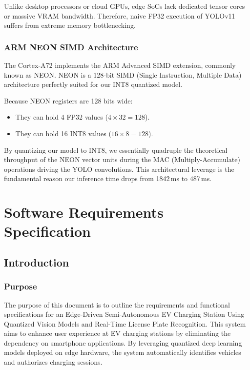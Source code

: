 \documentclass[11pt]{report}
\begin{document}
Unlike desktop processors or cloud GPUs, edge SoCs lack dedicated tensor cores or massive VRAM bandwidth. Therefore, naive FP32 execution of YOLOv11 suffers from extreme memory bottlenecking.

\subsection{ARM NEON SIMD Architecture}
The Cortex-A72 implements the ARM Advanced SIMD extension, commonly known as NEON. NEON is a 128-bit SIMD (Single Instruction, Multiple Data) architecture perfectly suited for our INT8 quantized model.

Because NEON registers are 128 bits wide:
\begin{itemize}
    \item They can hold 4 FP32 values ($4 \times 32 = 128$).
    \item They can hold 16 INT8 values ($16 \times 8 = 128$).
\end{itemize}

By quantizing our model to INT8, we essentially quadruple the theoretical throughput of the NEON vector units during the MAC (Multiply-Accumulate) operations driving the YOLO convolutions. This architectural leverage is the fundamental reason our inference time drops from 1842\,ms to 487\,ms.



\chapter{Software Requirements Specification}
\section{Introduction}
\subsection{Purpose}
The purpose of this document is to outline the requirements and functional specifications for an Edge-Driven Semi-Autonomous EV Charging Station Using Quantized Vision Models and Real-Time License Plate Recognition. This system aims to enhance user experience at EV charging stations by eliminating the dependency on smartphone applications. By leveraging quantized deep learning models deployed on edge hardware, the system automatically identifies vehicles and authorizes charging sessions.
\end{document}
